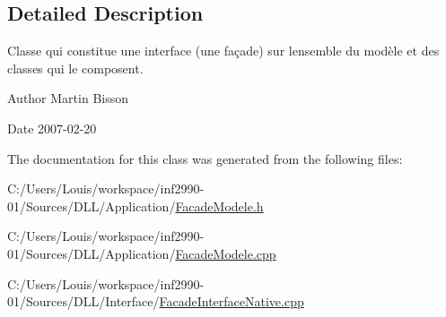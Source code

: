 \subsection{Detailed Description}
Classe qui constitue une interface (une façade) sur l\textquotesingle{}ensemble du modèle et des classes qui le composent. 

\begin{DoxyAuthor}{Author}
Martin Bisson 
\end{DoxyAuthor}
\begin{DoxyDate}{Date}
2007-\/02-\/20 
\end{DoxyDate}


The documentation for this class was generated from the following files\+:\begin{DoxyCompactItemize}
\item 
C\+:/\+Users/\+Louis/workspace/inf2990-\/01/\+Sources/\+D\+L\+L/\+Application/\hyperlink{_facade_modele_8h}{Facade\+Modele.\+h}\item 
C\+:/\+Users/\+Louis/workspace/inf2990-\/01/\+Sources/\+D\+L\+L/\+Application/\hyperlink{_facade_modele_8cpp}{Facade\+Modele.\+cpp}\item 
C\+:/\+Users/\+Louis/workspace/inf2990-\/01/\+Sources/\+D\+L\+L/\+Interface/\hyperlink{_facade_interface_native_8cpp}{Facade\+Interface\+Native.\+cpp}\end{DoxyCompactItemize}
